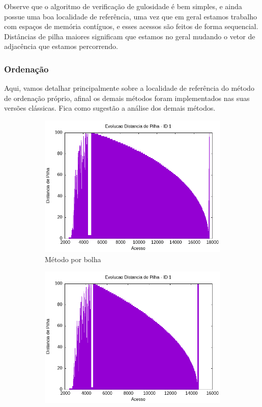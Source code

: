 \documentclass{article}
\begin{document}
Observe que o algoritmo de verificação de gulosidade é bem simples, e ainda possue uma boa localidade 
de referência, uma vez que em geral estamos trabalho com espaços de memória contíguos, e esses acessos 
são feitos de forma sequencial. Distâncias de pilha maiores significam que estamos no geral mudando o vetor 
de adjacência que estamos percorrendo.
\subsubsection{Ordenação}

Aqui, vamos detalhar principalmente sobre a localidade de referência do método de ordenação próprio, afinal
os demais métodos foram implementados nas suas versões clássicas. Fica como sugestão a análise dos demais métodos. 
\begin{figure}[H]
    \centering
    \hfill
    \begin{subfigure}[c]{0.4\textwidth}
        \centering
        \includegraphics[width=\textwidth]{./images/100-200/bubblesort/registro_a-distp-1.png}
        \caption{Método por bolha}
        \label{fig:ac05}
    \end{subfigure}
    \hfill
    \begin{subfigure}[c]{0.4\textwidth}
        \centering
        \includegraphics[width=\textwidth]{./images/100-200/selectionsort/registro_a-distp-1.png}

\end{subfigure}
\end{figure}
\end{document}
